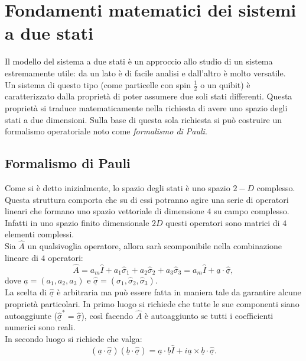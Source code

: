\section{Fondamenti matematici dei sistemi a due stati}
Il modello del sistema a due stati è un approccio allo studio di un sistema estremamente utile: da un lato è di facile analisi e dall'altro è molto versatile.\\ 
Un sistema di questo tipo (come particelle con spin $\frac{1}{2}$ o un quibit) è caratterizzato dalla proprietà di poter assumere due soli stati differenti. Questa proprietà si traduce matematicamente nella richiesta di avere uno spazio degli stati a due dimensioni. Sulla base di questa sola richiesta si può costruire un formalismo operatoriale noto come \emph{formalismo di Pauli}.

\subsection{Formalismo di Pauli}
Come si è detto inizialmente, lo spazio degli stati è uno spazio $2-D$ complesso. Questa struttura comporta che su di essi potranno agire una serie di operatori lineari che formano uno spazio vettoriale di dimensione $4$ su campo complesso. Infatti in uno spazio finito dimensionale $2D$ questi operatori sono matrici di $4$ elementi complessi.\\Sia $\hat{A}$ un qualsivoglia operatore, allora sarà scomponibile nella combinazione lineare di $4$ operatori:
\begin{equation*}
    \hat{A}=a_m\hat{I}+a_1\hat{\sigma}_1+a_2\hat{\sigma}_2+a_3\hat{\sigma}_3=a_m\hat{I}+\underline{a}\cdot\hat{\underline{\sigma}},
\end{equation*} 
dove $\underline{a}=(a_1,a_2,a_3)$ e $\hat{\underline{\sigma}}=(\hat{\sigma}_1,\hat{\sigma}_2,\hat{\sigma}_3)$.\\
La scelta di $\hat{\underline{\sigma}}$ è arbitraria ma può essere fatta in maniera tale da garantire alcune proprietà particolari. In primo luogo si richiede che tutte le sue componenti siano autoaggiunte ($\hat{\underline{\sigma}}^*=\hat{\underline{\sigma}}$), così facendo $\hat{A}$ è autoaggiunto se tutti i coefficienti numerici sono reali.\\
In secondo luogo si richiede che valga:
\begin{equation*}
    (\underline{a}\cdot\hat{\underline{\sigma}})(\underline{b}\cdot\hat{\underline{\sigma}})=\underline{a}\cdot\underline{b}\hat{I}+i\underline{a}\times \underline{b}\cdot \hat{\underline{\sigma}}.
\end{equation*}
